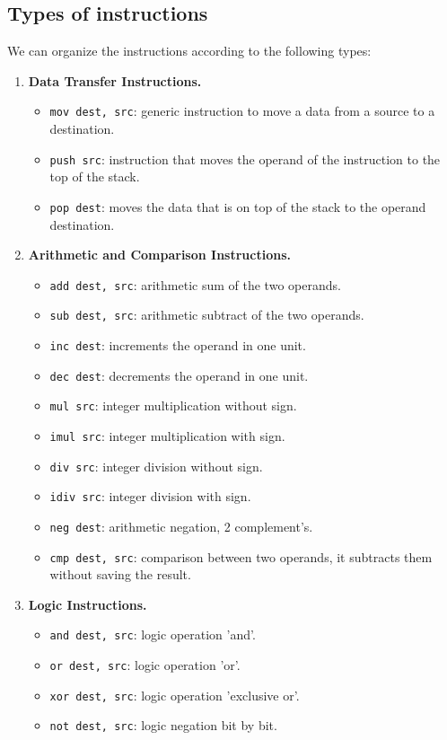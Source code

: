 \subsection{Types of instructions}
We can organize the instructions according to the following types:
\begin{enumerate}
\item \textbf{Data Transfer Instructions.}
	\begin{itemize}
	\item \texttt{mov dest, src}: generic instruction to move a data from a source to a destination.
	\item \texttt{push src}: instruction that moves the operand of the instruction to the top of the stack.
	\item \texttt{pop dest}: moves the data that is on top of the stack to the operand destination.
	\end{itemize}

\item \textbf{Arithmetic and Comparison Instructions.}
	\begin{itemize}
	\item \texttt{add dest, src}: arithmetic sum of the two operands.
	\item \texttt{sub dest, src}: arithmetic subtract of the two operands.
	\item \texttt{inc dest}: increments the operand in one unit.
	\item \texttt{dec dest}: decrements the operand in one unit.
	\item \texttt{mul src}: integer multiplication without sign.
	\item \texttt{imul src}: integer multiplication with sign.
	\item \texttt{div src}: integer division without sign.
	\item \texttt{idiv src}: integer division with sign.
	\item \texttt{neg dest}: arithmetic negation, 2 complement's.
	\item \texttt{cmp dest, src}: comparison between two operands, it subtracts them without saving the result.
	\end{itemize}

\item \textbf{Logic Instructions.}
	\begin{itemize}
	\item \texttt{and dest, src}: logic operation 'and'.
	\item \texttt{or dest, src}: logic operation 'or'.
	\item \texttt{xor dest, src}: logic operation 'exclusive or'.
	\item \texttt{not dest, src}: logic negation bit by bit.
	\end{itemize}
	

\end{enumerate}
